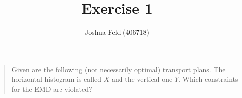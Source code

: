 \documentclass[english]{exercise}
\title{Exercise 1}
\author{Joshua Feld (406718)}
\begin{document}
	\maketitle


	\section{}

	\begin{quote}
		Given are the following (not necessarily optimal) transport plans.
		The horizontal histogram is called \(X\) and the vertical one \(Y\).
		Which constraints for the EMD are violated?
	\end{quote}
\end{document}
